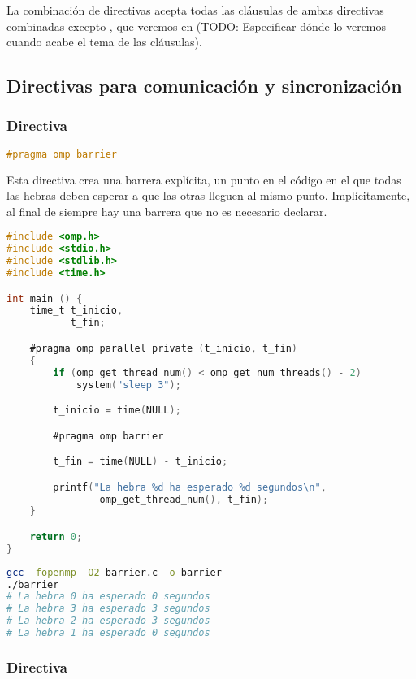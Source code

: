 La combinación de directivas acepta todas las cláusulas de ambas directivas combinadas excepto , que veremos en (TODO\@: Especificar dónde lo veremos cuando acabe el tema de las cláusulas).

\subsection{Directivas para comunicación y sincronización}\label{directivas-openmp-directivas}

\subsubsection{Directiva }

\begin{lstlisting}[language=C]
#pragma omp barrier
\end{lstlisting}

Esta directiva crea una barrera explícita, un punto en el código en el que todas las hebras deben esperar a que las otras lleguen al mismo punto.
Implícitamente, al final de  siempre hay una barrera que no es necesario declarar.

\begin{lstlisting}[language=C]
#include <omp.h>
#include <stdio.h>
#include <stdlib.h>
#include <time.h>

int main () {
	time_t t_inicio,
	       t_fin;

	#pragma omp parallel private (t_inicio, t_fin)
	{
		if (omp_get_thread_num() < omp_get_num_threads() - 2)
			system("sleep 3");

		t_inicio = time(NULL);

		#pragma omp barrier

		t_fin = time(NULL) - t_inicio;

		printf("La hebra %d ha esperado %d segundos\n",
		        omp_get_thread_num(), t_fin);
	}

	return 0;
}
\end{lstlisting}

\begin{lstlisting}[language=sh]
gcc -fopenmp -O2 barrier.c -o barrier
./barrier
# La hebra 0 ha esperado 0 segundos
# La hebra 3 ha esperado 3 segundos
# La hebra 2 ha esperado 3 segundos
# La hebra 1 ha esperado 0 segundos
\end{lstlisting}

\subsubsection{Directiva }

